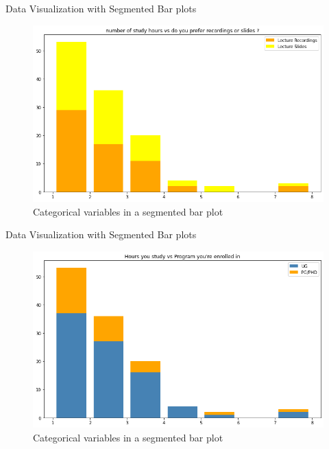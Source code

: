 \documentclass{beamer}
\begin{document}
\begin{frame}
\begin{block}{Data Visualization with Segmented Bar plots}
\begin{figure}[hbtp]
\caption{Categorical variables in a segmented bar plot}
\centering
\includegraphics[scale=0.45]{output5.png}
\end{figure}
\end{block}
\end{frame}

\begin{frame}
\begin{block}{Data Visualization with Segmented Bar plots}
\begin{figure}[hbtp]
\caption{Categorical variables in a segmented bar plot}
\centering
\includegraphics[scale=0.45]{hoursprogram.png}
\end{figure}
\end{block}
\end{frame}
\end{document}
